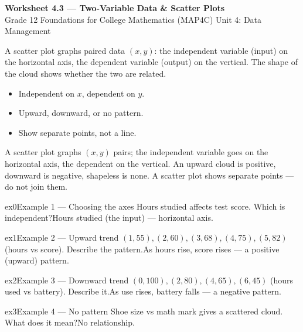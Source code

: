 \documentclass[11pt]{article}
\begin{document}
\begin{center}
{\LARGE\bfseries\color{titleblue}Worksheet 4.3 --- Two-Variable Data \& Scatter Plots}\\[2pt]
{\small Grade 12 Foundations for College Mathematics (MAP4C) \textperiodcentered{} Unit 4: Data Management}
\end{center}

\begin{ideabox}
A scatter plot graphs paired data $(x,y)$: the independent variable (input) on the horizontal axis, the dependent variable (output) on the vertical. The shape of the cloud shows whether the two are related.
\begin{itemize}[leftmargin=*,itemsep=2pt]
  \item Independent on $x$, dependent on $y$.
  \item Upward, downward, or no pattern.
  \item Show separate points, not a line.
\end{itemize}
\end{ideabox}

\begin{learnbox}
A scatter plot graphs $(x,y)$ pairs; the independent variable goes on the horizontal axis, the dependent on the vertical.
An upward cloud is positive, downward is negative, shapeless is none.
A scatter plot shows separate points — do not join them.
\end{learnbox}


\begin{example}{ex0}{Example 1 --- Choosing the axes}
Hours studied affects test score. Which is independent?\soln Hours studied (the input) — horizontal axis.
\end{example}

\begin{example}{ex1}{Example 2 --- Upward trend}
$(1,55),(2,60),(3,68),(4,75),(5,82)$ (hours vs score). Describe the pattern.\soln As hours rise, score rises — a positive (upward) pattern.
\end{example}

\begin{example}{ex2}{Example 3 --- Downward trend}
$(0,100),(2,80),(4,65),(6,45)$ (hours used vs battery). Describe it.\soln As use rises, battery falls — a negative pattern.
\end{example}

\begin{example}{ex3}{Example 4 --- No pattern}
Shoe size vs math mark gives a scattered cloud. What does it mean?\soln No relationship.
\end{example}
\end{document}
